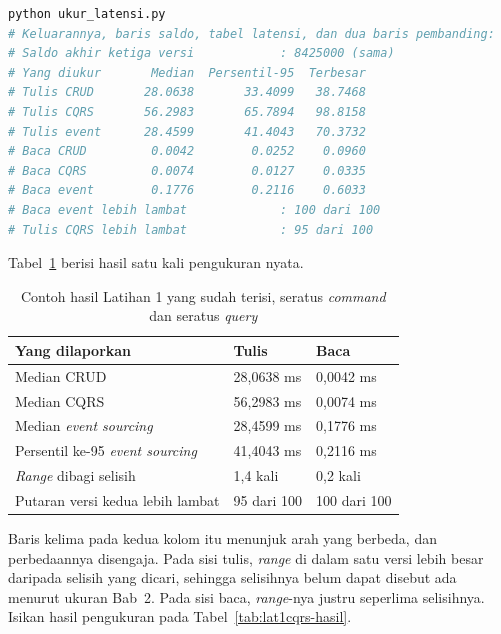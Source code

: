 \begin{lstlisting}[language=bash, caption={Mengukur \textit{write cost} dan
  \textit{read cost}, skrip tersedia di
  \berkas{sources/chapter10/ukur_latensi.py}}, label=lst:jalankan-latensi10]
python ukur_latensi.py
# Keluarannya, baris saldo, tabel latensi, dan dua baris pembanding:
# Saldo akhir ketiga versi            : 8425000 (sama)
# Yang diukur       Median  Persentil-95  Terbesar
# Tulis CRUD       28.0638       33.4099   38.7468
# Tulis CQRS       56.2983       65.7894   98.8158
# Tulis event      28.4599       41.4043   70.3732
# Baca CRUD         0.0042        0.0252    0.0960
# Baca CQRS         0.0074        0.0127    0.0335
# Baca event        0.1776        0.2116    0.6033
# Baca event lebih lambat             : 100 dari 100
# Tulis CQRS lebih lambat             : 95 dari 100
\end{lstlisting}

Tabel~\ref{tab:lat1cqrs-contoh} berisi hasil satu kali pengukuran nyata.

\begin{table}[htbp]
  \centering
  \caption{Contoh hasil Latihan 1 yang sudah terisi, seratus \textit{command} dan
    seratus \textit{query}}
  \label{tab:lat1cqrs-contoh}
  \begin{tabularx}{\textwidth}{|X|l|l|}
    \hline
    \textbf{Yang dilaporkan} & \textbf{Tulis} & \textbf{Baca} \\
    \hline
    Median CRUD & 28,0638 ms & 0,0042 ms \\
    \hline
    Median CQRS & 56,2983 ms & 0,0074 ms \\
    \hline
    Median \textit{event sourcing} & 28,4599 ms & 0,1776 ms \\
    \hline
    Persentil ke-95 \textit{event sourcing} & 41,4043 ms & 0,2116 ms \\
    \hline
    \textit{Range} dibagi selisih & 1,4 kali & 0,2 kali \\
    \hline
    Putaran versi kedua lebih lambat & 95 dari 100 & 100 dari 100 \\
    \hline
  \end{tabularx}
\end{table}

Baris kelima pada kedua kolom itu menunjuk arah yang berbeda, dan perbedaannya
disengaja. Pada sisi tulis, \textit{range} di dalam satu versi lebih besar
daripada selisih yang dicari, sehingga selisihnya belum dapat disebut ada
menurut ukuran Bab~2. Pada sisi baca, \textit{range}-nya justru
seperlima selisihnya. Isikan hasil pengukuran pada
Tabel~\ref{tab:lat1cqrs-hasil}.

